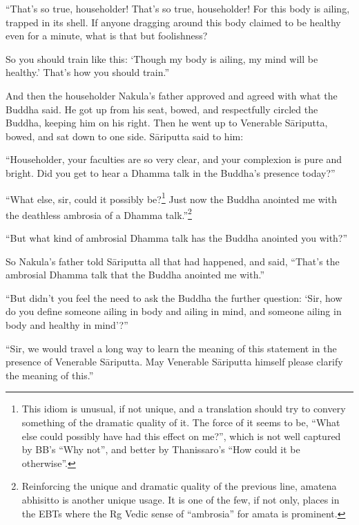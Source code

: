 \documentclass[12pt,openany]{book}%
\begin{document}
“That’s so true, householder! That’s so true, householder! For this body is ailing, trapped in its shell. If anyone dragging around this body claimed to be healthy even for a minute, what is that but foolishness? 

So you should train like this: ‘Though my body is ailing, my mind will be healthy.’ That’s how you should train.” 

And then the householder Nakula’s father approved and agreed with what the Buddha said. He got up from his seat, bowed, and respectfully circled the Buddha, keeping him on his right. Then he went up to Venerable \textsanskrit{Sāriputta}, bowed, and sat down to one side. \textsanskrit{Sāriputta} said to him: 

“Householder, your faculties are so very clear, and your complexion is pure and bright. Did you get to hear a Dhamma talk in the Buddha’s presence today?” 

“What else, sir, could it possibly be?\footnote{This idiom is unusual, if not unique, and a translation should try to convery something of the dramatic quality of it. The force of it seems to be, “What else could possibly have had this effect on me?”, which is not well captured by BB’s “Why not”, and better by Thanissaro’s “How could it be otherwise”. } Just now the Buddha anointed me with the deathless ambrosia of a Dhamma talk.”\footnote{Reinforcing the unique and dramatic quality of the previous line, amatena abhisitto is another unique usage. It is one of the few, if not only, places in the EBTs where the Rg Vedic sense of “ambrosia” for amata is prominent. } 

“But what kind of ambrosial Dhamma talk has the Buddha anointed you with?” 

So Nakula’s father told \textsanskrit{Sāriputta} all that had happened, and said, “That’s the ambrosial Dhamma talk that the Buddha anointed me with.” 

“But didn’t you feel the need to ask the Buddha the further question: ‘Sir, how do you define someone ailing in body and ailing in mind, and someone ailing in body and healthy in mind’?” 

“Sir, we would travel a long way to learn the meaning of this statement in the presence of Venerable \textsanskrit{Sāriputta}. May Venerable \textsanskrit{Sāriputta} himself please clarify the meaning of this.” 
\end{document}
